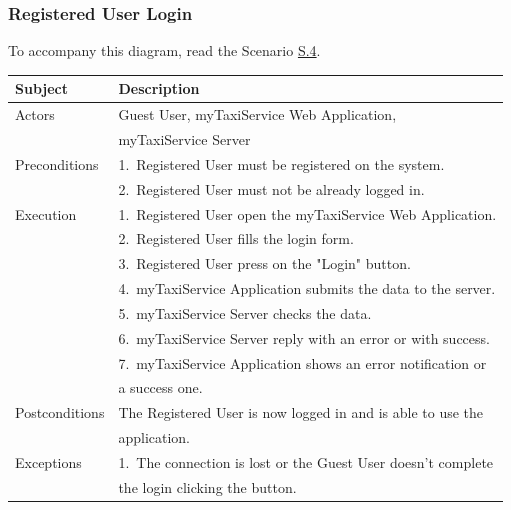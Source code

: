 \subsubsection{Registered User Login}
			To accompany this diagram, read the Scenario \hyperref[sec:RegisteredUserLoginScenario]{S.4}.

				\begin{table}[htpb]
					\centering
					\label{tab:RegisteredUserLoginDiagramTable}
					\begin{tabularx}{\textwidth}{ll}
						\hline
						\hline
							\textbf{Subject}
						& 
							\textbf{Description}\\
						\hline
							Actors	       &  Guest User, myTaxiService Web Application, \\
										   &  myTaxiService Server\\
						\hline
							Preconditions  &  1.~Registered User must be registered on the system.\\
							               &  2.~Registered User must not be already logged in.\\
						\hline
							Execution      &  1.~Registered User open the myTaxiService Web Application.\\
										   &  2.~Registered User fills the login form.\\
										   &  3.~Registered User press on the "Login" button.\\
										   &  4.~myTaxiService Application submits the data to the server.\\
										   &  5.~myTaxiService Server checks the data.\\
										   &  6.~myTaxiService Server reply with an error or with success.\\
										   &  7.~myTaxiService Application shows an error notification or\\
										   &     a success one.\\
						\hline
							Postconditions &  The Registered User is now logged in and is able to use the\\
							               &  application.\\
						\hline
							Exceptions     &  1.~The connection is lost or the Guest User doesn't complete\\ 
										   &     the login clicking the button.\\
									
						\hline
						\hline
					\end{tabularx}
				\end{table}
				
